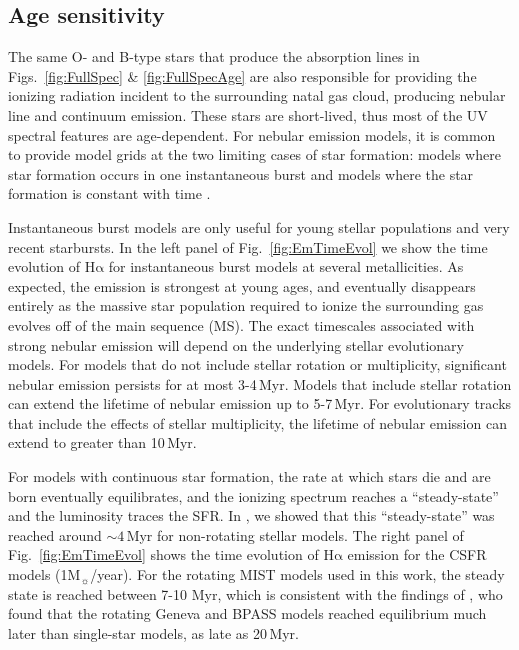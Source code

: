 \documentclass[preprint2,trackchanges]{aastex62}
\newcommand\Msun{\ensuremath{\mathrm{M_{\sun}}}\xspace}
\newcommand{\ha}{\ensuremath{\mathrm{H\alpha}}\xspace}
\newcommand{\Myr}{$\,$Myr\xspace}
\begin{document}

\subsection{Age sensitivity}\label{sec:mod:age}

The same O- and B-type stars that produce the absorption lines in Figs.~\ref{fig:FullSpec} \& \ref{fig:FullSpecAge} are also responsible for providing the ionizing radiation incident to the surrounding natal gas cloud, producing nebular line and continuum emission. These stars are short-lived, thus most of the UV spectral features are age-dependent. For nebular emission models, it is common to provide model grids at the two limiting cases of star formation: models where star formation occurs in one instantaneous burst and models where the star formation is constant with time \citep[e.g.,][]{Dopita+2000, Kewley+2001, Dopita+2006, Levesque+2012, Dopita+2013, Gutkin+2016}.

Instantaneous burst models are only useful for young stellar populations and very recent starbursts. In the left panel of Fig.~\ref{fig:EmTimeEvol} we show the time evolution of \ha for instantaneous burst models at several metallicities. As expected, the emission is strongest at young ages, and eventually disappears entirely as the massive star population required to ionize the surrounding gas evolves off of the main sequence (MS). The exact timescales associated with strong nebular emission will depend on the underlying stellar evolutionary models. For models that do not include stellar rotation or multiplicity, significant nebular emission persists for at most 3-4\Myr. Models that include stellar rotation can extend the lifetime of nebular emission up to 5-7\Myr \citep[e.g., MIST, used in this work;][]{Byler+2017, Choi+2017}. For evolutionary tracks that include the effects of stellar multiplicity, the lifetime of nebular emission can extend to greater than 10\Myr\citep[e.g., BPASS;][]{Eldridge+2012, Stanway+2014, Xiao+2018}.

For models with continuous star formation, the rate at which stars die and are born eventually equilibrates, and the ionizing spectrum reaches a ``steady-state'' and the luminosity traces the SFR. In \citet{Byler+2017}, we showed that this ``steady-state'' was reached around ${\sim}4$\Myr for non-rotating stellar models. The right panel of Fig.~\ref{fig:EmTimeEvol} shows the time evolution of \ha emission for the CSFR models (1\Msun/year). For the rotating MIST models used in this work, the steady state is reached between 7-10 Myr, which is consistent with the findings of \citet{Jaskot+2016}, who found that the rotating Geneva and BPASS models reached equilibrium much later than single-star models, as late as 20\Myr.
\end{document}
